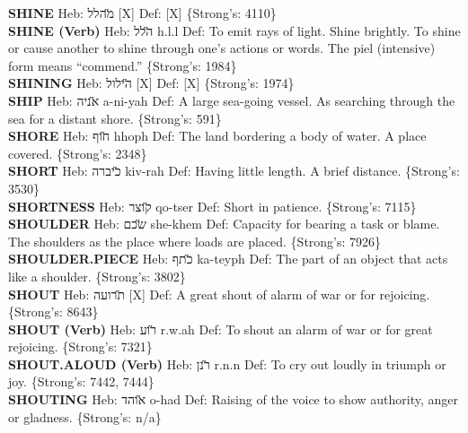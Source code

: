 {\textbf{SHINE} Heb: {\large\H מהלל} {[}X{]} Def: {[}X{]} \{Strong's: 4110\}\hfill{}\\

\textbf{SHINE (Verb)} Heb: {\large\H הלל} h.l.l Def: To emit rays of light. Shine brightly. To shine or cause another to shine through one’s actions or words. The piel (intensive) form means ``commend.'' \{Strong's: 1984\}\hfill{}\\

\textbf{SHINING} Heb: {\large\H הילול} {[}X{]} Def: {[}X{]} \{Strong's: 1974\}\hfill{}\\

\textbf{SHIP} Heb: {\large\H אניה} a-ni-yah Def: A large sea-going vessel. As searching through the sea for a distant shore. \{Strong's: 591\}\hfill{}\\

\textbf{SHORE} Heb: {\large\H חוף} hhoph Def: The land bordering a body of water. A place covered. \{Strong's: 2348\}\hfill{}\\

\textbf{SHORT} Heb: {\large\H כיברה} kiv-rah Def: Having little length. A brief distance. \{Strong's: 3530\}\hfill{}\\

\textbf{SHORTNESS} Heb: {\large\H קוצר} qo-tser Def: Short in patience. \{Strong's: 7115\}\hfill{}\\

\textbf{SHOULDER} Heb: {\large\H שכם} she-khem Def: Capacity for bearing a task or blame. The shoulders as the place where loads are placed. \{Strong's: 7926\}\hfill{}\\

\textbf{SHOULDER.PIECE} Heb: {\large\H כתף} ka-teyph Def: The part of an object that acts like a shoulder. \{Strong's: 3802\}\hfill{}\\

\textbf{SHOUT} Heb: {\large\H תרועה} {[}X{]} Def: A great shout of alarm of war or for rejoicing. \{Strong's: 8643\}\hfill{}\\

\textbf{SHOUT (Verb)} Heb: {\large\H רוע} r.w.ah Def: To shout an alarm of war or for great rejoicing. \{Strong's: 7321\}\hfill{}\\

\textbf{SHOUT.ALOUD (Verb)} Heb: {\large\H רנן} r.n.n Def: To cry out loudly in triumph or joy. \{Strong's: 7442, 7444\}\hfill{}\\

\textbf{SHOUTING} Heb: {\large\H אוהד} o-had Def: Raising of the voice to show authority, anger or gladness. \{Strong's: n/a\}\hfill{}\\

}
